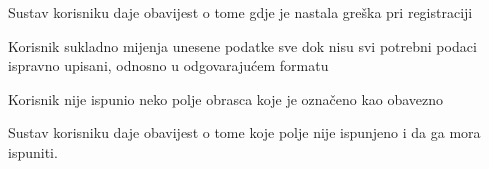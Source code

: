 \begin{packed_item}
\begin{packed_item}
\begin{packed_enum}
								\item Sustav korisniku daje obavijest o tome gdje je nastala greška pri registraciji
								\item Korisnik sukladno mijenja unesene podatke sve dok nisu svi potrebni podaci ispravno upisani, odnosno u odgovarajućem formatu
								
							\end{packed_enum}
							\item[2.b]  Korisnik nije ispunio neko polje obrasca koje je označeno kao obavezno
							\item[] \begin{packed_enum}
								
								\item Sustav korisniku daje obavijest o tome koje polje nije ispunjeno i da ga mora ispuniti.
								
							\end{packed_enum}
							
						\end{packed_item}
			
					\end{packed_item}

